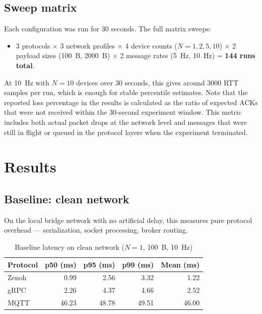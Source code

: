 \documentclass[11pt,a4paper]{article}
\begin{document}
\subsection{Sweep matrix}

Each configuration was run for 30 seconds. The full matrix sweeps:

\begin{itemize}
    \item 3 protocols $\times$ 3 network profiles $\times$ 4 device counts ($N = 1, 2, 5, 10$) $\times$ 2 payload sizes (100~B, 2000~B) $\times$ 2 message rates (5~Hz, 10~Hz) = \textbf{144 runs total}.
\end{itemize}

At 10~Hz with $N=10$ devices over 30 seconds, this gives around 3000 RTT samples per run, which is enough for stable percentile estimates. Note that the reported loss percentage in the results is calculated as the ratio of expected ACKs that were not received within the 30-second experiment window. This metric includes both actual packet drops at the network level and messages that were still in flight or queued in the protocol layers when the experiment terminated.

\section{Results}

\subsection{Baseline: clean network}

On the local bridge network with no artificial delay, this measures pure protocol overhead --- serialization, socket processing, broker routing.

\begin{table}[H]
\centering
\caption{Baseline latency on clean network ($N=1$, 100~B, 10~Hz)}
\label{tab:baseline}
\begin{tabular}{lrrrr}
\toprule
Protocol & p50 (ms) & p95 (ms) & p99 (ms) & Mean (ms) \\
\midrule
Zenoh & 0.99 & 2.56 & 3.32 & 1.22 \\
gRPC  & 2.26 & 4.37 & 4.66 & 2.52 \\
MQTT  & 46.23 & 48.78 & 49.51 & 46.00 \\
\bottomrule
\end{tabular}
\end{table}
\end{document}
